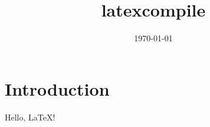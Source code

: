 \documentclass[11pt]{article}
\title{latexcompile}
\author{}
\date{\today}
\begin{document}
\maketitle

\section{Introduction}
Hello, \LaTeX!
\end{document}
